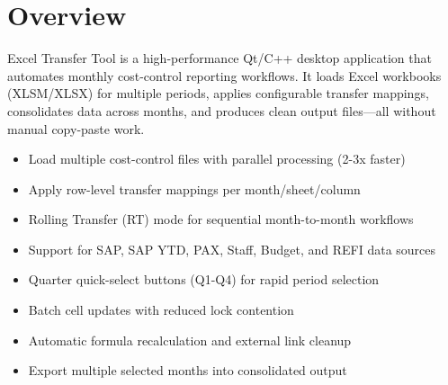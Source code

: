 \documentclass[11pt,a4paper]{article}
\begin{document}
\begin{titlepage}
\begin{center}
\vspace{0.8cm}


\end{center}

\restoregeometry
\end{titlepage}

\newpage
\thispagestyle{fancy}
{\hypersetup{linkcolor=DarkText}\tableofcontents}
\newpage

\section{Overview}

Excel Transfer Tool is a high-performance Qt/C++ desktop application that automates monthly cost-control reporting workflows. It loads Excel workbooks (XLSM/XLSX) for multiple periods, applies configurable transfer mappings, consolidates data across months, and produces clean output files—all without manual copy-paste work.

\begin{infobox}
\begin{itemize}[leftmargin=*, itemsep=2pt]
\item Load multiple cost-control files with parallel processing (2-3x faster)
\item Apply row-level transfer mappings per month/sheet/column
\item Rolling Transfer (RT) mode for sequential month-to-month workflows
\item Support for SAP, SAP YTD, PAX, Staff, Budget, and REFI data sources
\item Quarter quick-select buttons (Q1-Q4) for rapid period selection
\item Batch cell updates with reduced lock contention
\item Automatic formula recalculation and external link cleanup
\item Export multiple selected months into consolidated output
\end{itemize}
\end{infobox}
\end{document}
